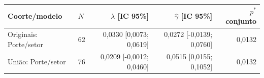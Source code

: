 \begin{tabular}{llrrr}
\toprule
Coorte/modelo & $N$ & $\widehat\lambda$ [IC 95\%] & $\widehat\gamma$ [IC 95\%] & $p^*$ conjunto\\
\midrule
Originais: Porte/setor & 62 & 0,0330 [0,0073; 0,0619] & 0,0272 [-0,0139; 0,0760] & 0,0132\\
União: Porte/setor & 76 & 0,0209 [-0,0012; 0,0460] & 0,0515 [0,0155; 0,1052] & 0,0132\\
\bottomrule
\end{tabular}
